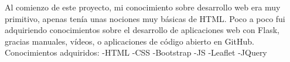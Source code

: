 Al comienzo de este proyecto, mi conocimiento sobre desarrollo web era muy primitivo, apenas tenía unas nociones muy básicas de HTML. Poco a poco fui adquiriendo conocimientos sobre el desarrollo de aplicaciones web con Flask, gracias manuales, vídeos, o aplicaciones de código abierto en GitHub.
Conocimientos adquiridos:
-HTML
-CSS
-Bootstrap
-JS
-Leaflet
-JQuery



\begin{comment}
Etapas del proyecto


Conocimientos de la carrera



Este apartado pretende recoger los aspectos más interesantes del desarrollo del proyecto, comentados por los autores del mismo.
Debe incluir desde la exposición del ciclo de vida utilizado, hasta los detalles de mayor relevancia de las fases de análisis, diseño e implementación.
Se busca que no sea una mera operación de copiar y pegar diagramas y extractos del código fuente, sino que realmente se justifiquen los caminos de solución que se han tomado, especialmente aquellos que no sean triviales.
Puede ser el lugar más adecuado para documentar los aspectos más interesantes del diseño y de la implementación, con un mayor hincapié en aspectos tales como el tipo de arquitectura elegido, los índices de las tablas de la base de datos, normalización y desnormalización, distribución en ficheros3, reglas de negocio dentro de las bases de datos (EDVHV GH GDWRV DFWLYDV), aspectos de desarrollo relacionados con el WWW...
Este apartado, debe convertirse en el resumen de la experiencia práctica del proyecto, y por sí mismo justifica que la memoria se convierta en un documento útil, fuente de referencia para los autores, los tutores y futuros alumnos.
\end{comment}
